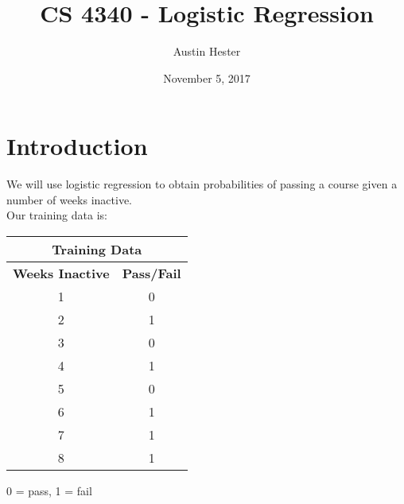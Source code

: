 \documentclass{article}
\begin{document}
\title{CS 4340 - Logistic Regression}
\author{Austin Hester}
\date{November 5, 2017}
\maketitle

\makeatletter
\def\@seccntformat#1{%
	 \expandafter\ifx\csname c@#1\endcsname\c@section\else
	  \csname the#1\endcsname\quad
  \fi}
\makeatother



\section*{Introduction}

We will use logistic regression to obtain probabilities of passing a course given a number of weeks inactive. \\

Our training data is:  

\begin{center}
\begin{tabular}{|c|c|}
	\hline
	\multicolumn{2}{|c|}{\textbf{Training Data}} \\\hline
	\textbf{Weeks Inactive} & \textbf{Pass/Fail} \\\hline
	1 & 0 \\
	2 & 1\\
	3 & 0 \\
	4 & 1\\
	5 & 0\\
	6 & 1\\
	7 & 1\\
	8 & 1\\
	\hline
\end{tabular}

0 = pass, 1 =  fail
\end{center}



\newpage
\end{document}
